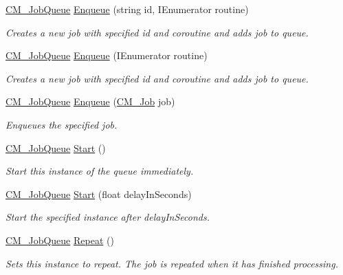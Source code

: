 \begin{DoxyCompactItemize}
\hyperlink{class_c_m___job_queue}{C\+M\+\_\+\+Job\+Queue} \hyperlink{class_c_m___job_queue_a8c3f4534e75a50c47a64d3324ca75f67}{Enqueue} (string id, I\+Enumerator routine)
\begin{DoxyCompactList}\small\item\em Creates a new job with specified id and coroutine and adds job to queue. \end{DoxyCompactList}\item 
\hyperlink{class_c_m___job_queue}{C\+M\+\_\+\+Job\+Queue} \hyperlink{class_c_m___job_queue_a36897e683ccf438e4f1e032645423cd5}{Enqueue} (I\+Enumerator routine)
\begin{DoxyCompactList}\small\item\em Creates a new job with specified id and coroutine and adds job to queue. \end{DoxyCompactList}\item 
\hyperlink{class_c_m___job_queue}{C\+M\+\_\+\+Job\+Queue} \hyperlink{class_c_m___job_queue_a5a0c5479c91848563c3dbc0e4c218f14}{Enqueue} (\hyperlink{class_c_m___job}{C\+M\+\_\+\+Job} job)
\begin{DoxyCompactList}\small\item\em Enqueues the specified job. \end{DoxyCompactList}\item 
\hyperlink{class_c_m___job_queue}{C\+M\+\_\+\+Job\+Queue} \hyperlink{class_c_m___job_queue_a0b741b6ee48616f0bc2f1e14360f0575}{Start} ()
\begin{DoxyCompactList}\small\item\em Start this instance of the queue immediately. \end{DoxyCompactList}\item 
\hyperlink{class_c_m___job_queue}{C\+M\+\_\+\+Job\+Queue} \hyperlink{class_c_m___job_queue_afacbda3a733d0a18f0791923ffcbb4fa}{Start} (float delay\+In\+Seconds)
\begin{DoxyCompactList}\small\item\em Start the specified instance after delay\+In\+Seconds. \end{DoxyCompactList}\item 
\hyperlink{class_c_m___job_queue}{C\+M\+\_\+\+Job\+Queue} \hyperlink{class_c_m___job_queue_acf86ac86cf4899aa34e1951f657ff66a}{Repeat} ()
\begin{DoxyCompactList}\small\item\em Sets this instance to repeat. The job is repeated when it has finished processing. \end{DoxyCompactList}\item 

\end{DoxyCompactItemize}
